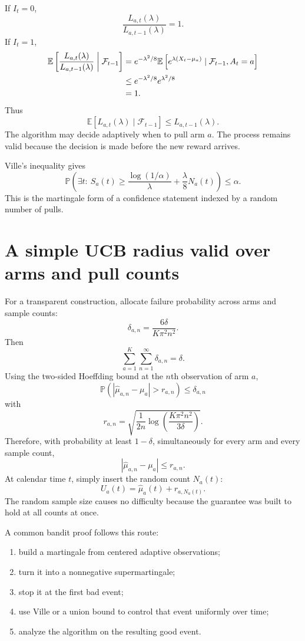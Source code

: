 \documentclass[en,nofont,11pt]{elegantbook}
\newcommand{\E}{\mathbb{E}}
\newcommand{\Pbb}{\mathbb{P}}
\newcommand{\F}{\mathcal{F}}
\begin{document}
If $I_t=0$,
\[
\frac{L_{a,t}(\lambda)}{L_{a,t-1}(\lambda)}=1.
\]
If $I_t=1$,
\begin{align*}
\E\left[
\frac{L_{a,t}(\lambda)}{L_{a,t-1}(\lambda)}
\biggm|\F_{t-1}
\right]
&=
e^{-\lambda^2/8}
\E\left[e^{\lambda(X_t-\mu_a)}\mid\F_{t-1},A_t=a\right]\\
&\le
e^{-\lambda^2/8}e^{\lambda^2/8}\\
&=1.
\end{align*}
Thus
\[
\E[L_{a,t}(\lambda)\mid\F_{t-1}]
\le L_{a,t-1}(\lambda).
\]
The algorithm may decide adaptively when to pull arm $a$. The process remains valid because the decision is made before the new reward arrives.

Ville's inequality gives
\[
\Pbb\left(
\exists t:\
S_a(t)
\ge
\frac{\log(1/\alpha)}{\lambda}
+
\frac{\lambda}{8}N_a(t)
\right)
\le\alpha.
\]
This is the martingale form of a confidence statement indexed by a random number of pulls.

\section{A simple UCB radius valid over arms and pull counts}

For a transparent construction, allocate failure probability across arms and sample counts:
\[
\delta_{a,n}
=
\frac{6\delta}{K\pi^2n^2}.
\]
Then
\[
\sum_{a=1}^{K}\sum_{n=1}^{\infty}\delta_{a,n}
=\delta.
\]
Using the two-sided Hoeffding bound at the $n$th observation of arm $a$,
\[
\Pbb\left(
|\widehat\mu_{a,n}-\mu_a|>r_{a,n}
\right)
\le\delta_{a,n}
\]
with
\[
\boxed{
r_{a,n}
=
\sqrt{
\frac{1}{2n}
\log\left(
\frac{K\pi^2n^2}{3\delta}
\right)
}.
}
\]
Therefore, with probability at least $1-\delta$, simultaneously for every arm and every sample count,
\[
|\widehat\mu_{a,n}-\mu_a|
\le r_{a,n}.
\]
At calendar time $t$, simply insert the random count $N_a(t)$:
\[
U_a(t)
=
\widehat\mu_a(t)
+
r_{a,N_a(t)}.
\]
The random sample size causes no difficulty because the guarantee was built to hold at all counts at once.

\begin{patternbox}
A common bandit proof follows this route:
\begin{enumerate}
\item build a martingale from centered adaptive observations;
\item turn it into a nonnegative supermartingale;
\item stop it at the first bad event;
\item use Ville or a union bound to control that event uniformly over time;
\item analyze the algorithm on the resulting good event.
\end{enumerate}
\end{patternbox}
\end{document}
